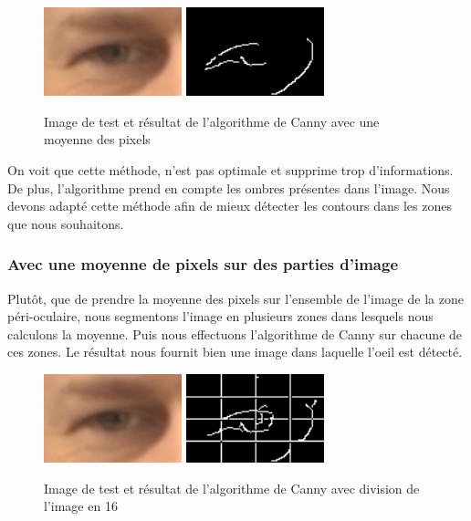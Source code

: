 \begin{figure}[H]
 \center
 \includegraphics[width=4cm]{image/original.png}
 \includegraphics[width=4cm]{image/canny_moyenne.png}
 \caption{Image de test et résultat de l'algorithme de Canny avec une moyenne des pixels}
\end{figure}

On voit que cette méthode, n'est pas optimale et supprime trop d'informations. De plus,
l'algorithme prend en compte les ombres présentes dans l'image. Nous devons adapté cette méthode
afin de mieux détecter les contours dans les zones que nous souhaitons.

\subsubsection{Avec une moyenne de pixels sur des parties d'image}

Plutôt, que de prendre la moyenne des pixels sur l'ensemble de l'image de la zone péri-oculaire, nous segmentons l'image
en plusieurs zones dans lesquels nous calculons la moyenne. Puis nous effectuons l'algorithme
de Canny sur chacune de ces zones. Le résultat nous fournit bien une image dans laquelle l'oeil
est détecté.

\begin{figure}[H]
 \center
 \includegraphics[width=4cm]{image/original.png}
 \includegraphics[width=4cm]{image/canny_decomposition.png}
 \caption{Image de test et résultat de l'algorithme de Canny avec division de l'image en 16}
\end{figure}

